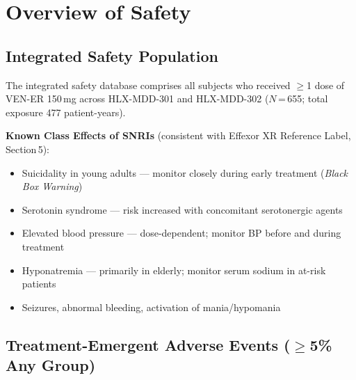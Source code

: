 \section{Overview of Safety}
\label{sec:safety}

\subsection{Integrated Safety Population}

The integrated safety database comprises all subjects who received $\geq$1 dose of VEN-ER
150\,mg across HLX-MDD-301 and HLX-MDD-302 ($N$\,=\,655; total exposure 477 patient-years).

\begin{regwarn}
\textbf{Known Class Effects of SNRIs} (consistent with Effexor XR Reference Label, Section\,5):\\[3pt]
\begin{itemize}[leftmargin=14pt, itemsep=1pt, topsep=0pt]
  \item Suicidality in young adults --- monitor closely during early treatment (\textit{Black Box Warning})
  \item Serotonin syndrome --- risk increased with concomitant serotonergic agents
  \item Elevated blood pressure --- dose-dependent; monitor BP before and during treatment
  \item Hyponatremia --- primarily in elderly; monitor serum sodium in at-risk patients
  \item Seizures, abnormal bleeding, activation of mania/hypomania
\end{itemize}
\end{regwarn}

\vspace{2mm}
\subsection{Treatment-Emergent Adverse Events ($\geq$5\% Any Group)}


